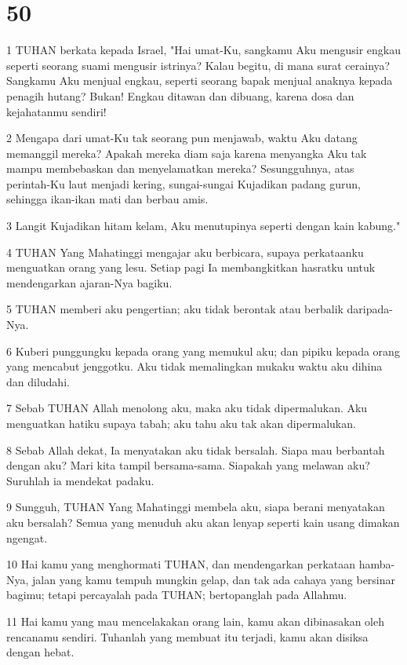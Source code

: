 \chapter{50}

\par 1 TUHAN berkata kepada Israel, "Hai umat-Ku, sangkamu Aku mengusir engkau seperti seorang suami mengusir istrinya? Kalau begitu, di mana surat cerainya? Sangkamu Aku menjual engkau, seperti seorang bapak menjual anaknya kepada penagih hutang? Bukan! Engkau ditawan dan dibuang, karena dosa dan kejahatanmu sendiri!
\par 2 Mengapa dari umat-Ku tak seorang pun menjawab, waktu Aku datang memanggil mereka? Apakah mereka diam saja karena menyangka Aku tak mampu membebaskan dan menyelamatkan mereka? Sesungguhnya, atas perintah-Ku laut menjadi kering, sungai-sungai Kujadikan padang gurun, sehingga ikan-ikan mati dan berbau amis.
\par 3 Langit Kujadikan hitam kelam, Aku menutupinya seperti dengan kain kabung."
\par 4 TUHAN Yang Mahatinggi mengajar aku berbicara, supaya perkataanku menguatkan orang yang lesu. Setiap pagi Ia membangkitkan hasratku untuk mendengarkan ajaran-Nya bagiku.
\par 5 TUHAN memberi aku pengertian; aku tidak berontak atau berbalik daripada-Nya.
\par 6 Kuberi punggungku kepada orang yang memukul aku; dan pipiku kepada orang yang mencabut jenggotku. Aku tidak memalingkan mukaku waktu aku dihina dan diludahi.
\par 7 Sebab TUHAN Allah menolong aku, maka aku tidak dipermalukan. Aku menguatkan hatiku supaya tabah; aku tahu aku tak akan dipermalukan.
\par 8 Sebab Allah dekat, Ia menyatakan aku tidak bersalah. Siapa mau berbantah dengan aku? Mari kita tampil bersama-sama. Siapakah yang melawan aku? Suruhlah ia mendekat padaku.
\par 9 Sungguh, TUHAN Yang Mahatinggi membela aku, siapa berani menyatakan aku bersalah? Semua yang menuduh aku akan lenyap seperti kain usang dimakan ngengat.
\par 10 Hai kamu yang menghormati TUHAN, dan mendengarkan perkataan hamba-Nya, jalan yang kamu tempuh mungkin gelap, dan tak ada cahaya yang bersinar bagimu; tetapi percayalah pada TUHAN; bertopanglah pada Allahmu.
\par 11 Hai kamu yang mau mencelakakan orang lain, kamu akan dibinasakan oleh rencanamu sendiri. Tuhanlah yang membuat itu terjadi, kamu akan disiksa dengan hebat.

